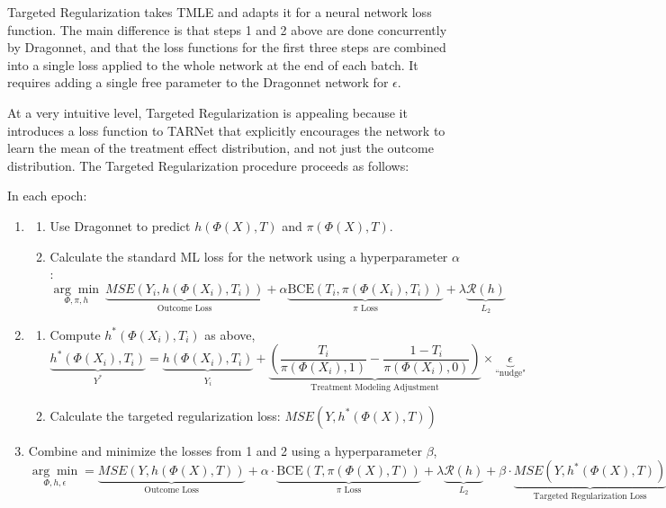Targeted Regularization takes TMLE and adapts it for a neural network loss function. The main difference is that steps 1 and 2 above are done concurrently by Dragonnet, and that the loss functions for the first three steps are combined into a single loss applied to the whole network at the end of each batch. It requires adding a single free parameter to the Dragonnet network for $\epsilon$.

 At a very intuitive level, Targeted Regularization is appealing because it introduces a loss function to TARNet that explicitly encourages the network to learn the mean of the treatment effect distribution, and not just the outcome distribution. The Targeted Regularization procedure proceeds as follows:

In each epoch:
\begin{enumerate}
\singlespacing
    \item \begin{enumerate}
    \item Use Dragonnet to predict $h(\Phi(X),T)$ and $\pi(\Phi(X),T)$.
    \item Calculate the standard ML loss for the network using a hyperparameter $\alpha$:
    $$\underset{\Phi,\pi,h}{\arg \min}\ \underbrace{MSE(Y_i,h(\Phi(X_i),T_i))}_{\text{Outcome Loss}} + \alpha \underbrace{\text{BCE}(T_i,\pi(\Phi(X_i),T_i))}_{\pi\text{ Loss}} +  \lambda\underbrace{\mathcal{R}(h)}_{L_2}$$
    \end{enumerate}
    \item \begin{enumerate}
    \item Compute $h^{*}(\Phi(X_i),T_i)$ as above,
    $$\underbrace{h^{*}(\Phi(X_i),T_i)}_{Y^*}=\underbrace{h(\Phi(X_i),T_i)}_{\hat{Y_i}}+\underbrace{(\frac{T_i}{\pi(\Phi(X_i),1)}-\frac{1-T_i}{\pi(\Phi(X_i),0)})}_{\text{Treatment Modeling Adjustment}}\times \underbrace{\epsilon}_{\text{``nudge"}}$$
    \item Calculate the targeted regularization loss: $MSE(Y,h^*(\Phi(X),T))$
    \end{enumerate}
  \item Combine and minimize the losses from 1 and 2 using a hyperparameter $\beta$,
    $$\underset{\Phi,h,\epsilon}{\arg \min}= \underbrace{MSE(Y,h(\Phi(X),T))}_{\text{Outcome Loss}} + \alpha \cdot \underbrace{\text{BCE}(T,\pi(\Phi(X),T))}_{\pi\text{ Loss}}+  \lambda\underbrace{\mathcal{R}(h)}_{L_2}+\beta\cdot \underbrace{MSE(Y,h^*(\Phi(X),T))}_{\text{Targeted Regularization Loss}}$$
\doublespacing
\end{enumerate}

